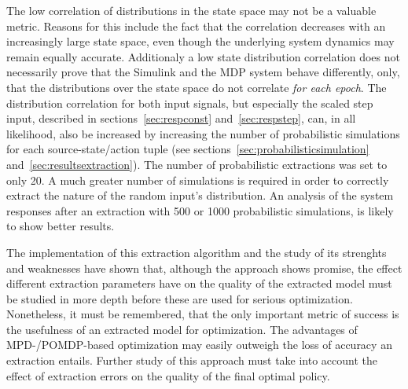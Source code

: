The low correlation of distributions in the state space may not be a valuable metric. Reasons for this include the fact that the correlation decreases with an increasingly large state space, even though the underlying system dynamics may remain equally accurate. Additionaly a low state distribution correlation does not necessarily prove that the Simulink and the MDP system behave differently, only, that the distributions over the state space do not correlate \textit{for each epoch}. The distribution correlation for both input signals, but especially the scaled step input, described in sections~\ref{sec:respconst} and~\ref{sec:respstep}, can, in all likelihood, also be increased by increasing the number of probabilistic simulations for each source-state/action tuple (see sections~\ref{sec:probabilisticsimulation} and~\ref{sec:resultsextraction}). The number of probabilistic extractions was set to only 20. A much greater number of simulations is required in order to correctly extract the nature of the random input's distribution. An analysis of the system responses after an extraction with 500 or 1000 probabilistic simulations, is likely to show better results.

The implementation of this extraction algorithm and the study of its strenghts and weaknesses have shown that, although the approach shows promise, the effect different extraction parameters have on the quality of the extracted model must be studied in more depth before these are used for serious optimization. Nonetheless, it must be remembered, that the only important metric of success is the usefulness of an extracted model for optimization. The advantages of MPD-/POMDP-based optimization may easily outweigh the loss of accuracy an extraction entails. Further study of this approach must take into account the effect of extraction errors on the quality of the final optimal policy.